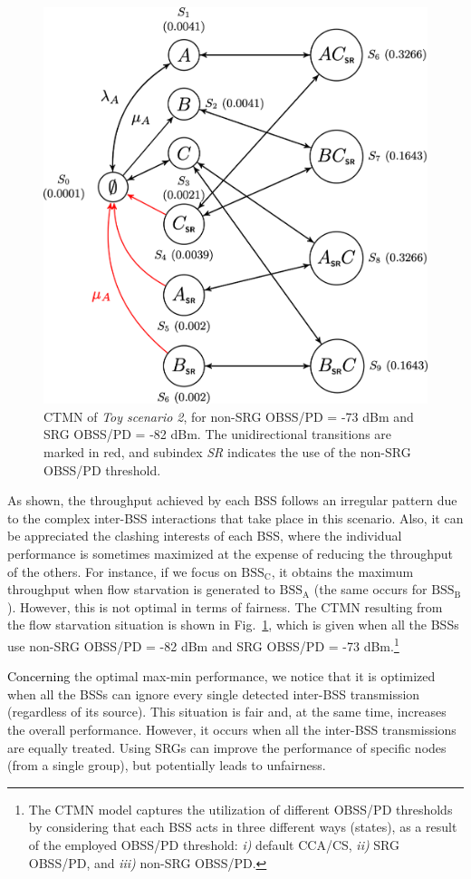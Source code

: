 \documentclass[preprint,12pt]{elsarticle}
\begin{document}
\begin{figure}[ht]
	\centering
	\includegraphics[width=.5\columnwidth]{ctmn_scenario_2}
	\caption{CTMN of \emph{Toy scenario 2}, for non-SRG OBSS/PD = -73 dBm and SRG OBSS/PD = -82 dBm. The unidirectional transitions are marked in red, and subindex \emph{SR} indicates the use of the non-SRG OBSS/PD threshold.}
	\label{fig:ctmn_scenario_2}
\end{figure}

As shown, the throughput achieved by each BSS follows an irregular pattern due to the complex inter-BSS interactions that take place in this scenario. Also, it can be appreciated the clashing interests of each BSS, where the individual performance is sometimes maximized at the expense of reducing the throughput of the others. For instance, if we focus on $\text{BSS}_\text{C}$, it obtains the maximum throughput when flow starvation is generated to $\text{BSS}_\text{A}$ (the same occurs for $\text{BSS}_\text{B}$). However, this is not optimal in terms of fairness. The CTMN resulting from the flow starvation situation is shown in Fig.~\ref{fig:ctmn_scenario_2}, which is given when all the BSSs use non-SRG OBSS/PD = -82 dBm and SRG OBSS/PD = -73 dBm.\footnote{The CTMN model captures the utilization of different OBSS/PD thresholds by considering that each BSS acts in three different ways (states), as a result of the employed OBSS/PD threshold: \emph{i)} default CCA/CS, \emph{ii)} SRG OBSS/PD, and \emph{iii)} non-SRG OBSS/PD.}

\textcolor{black}{Concerning} the optimal max-min performance, we notice that it is optimized when all the BSSs can ignore every single detected inter-BSS transmission (regardless of its source). This situation is fair and, at the same time, increases the overall performance. However, it occurs when all the inter-BSS transmissions are equally treated. Using SRGs can improve the performance of specific nodes (from a single group), but potentially leads to unfairness. 
\end{document}
